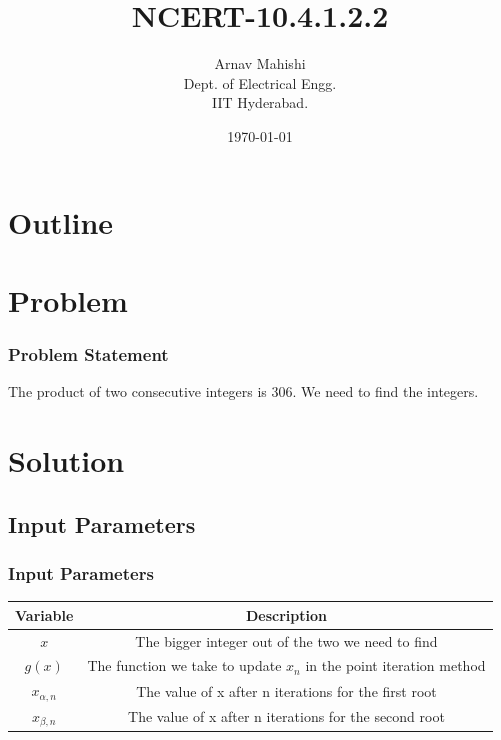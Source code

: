 \documentclass{beamer}
\title{NCERT-10.4.1.2.2}
\author{Arnav Mahishi \\ Dept. of Electrical Engg.\\IIT Hyderabad.}
\date{\today}
\providecommand{\brak}[1]{\ensuremath{\left(#1\right)}}
\theoremstyle{remark}
\numberwithin{equation}{section}
\begin{document}
\begin{frame}
\titlepage
\end{frame}
\section*{Outline}
\section{Problem}
\begin{frame}
\frametitle{Problem Statement}
The product of two consecutive integers is $306$. We need to find the integers.
\end{frame}
\section{Solution}
\subsection{Input Parameters}
\begin{frame}
\frametitle{Input Parameters}
\begin{table}[h!]
    \centering
    \begin{tabular}[12pt]{ |c| c|}
    \hline
    \textbf{Variable} & \textbf{Description}\\ 
    \hline
         $x$& The bigger integer out of the two we need to find\\
         \hline
         $g\brak{x}$& The function we take to update $x_n$ in the point iteration method\\
         \hline
         $x_{\alpha,n}$& The value of x after n iterations for the first root\\
         \hline
          $x_{\beta,n}$& The value of x after n iterations for the second root\\
          \hline
    \end{tabular}
    \label{tab:my_label}
\end{table}
\end{frame}
\end{document}
